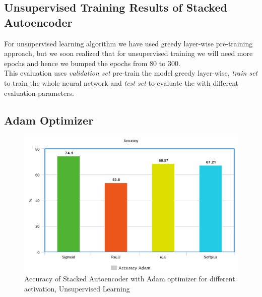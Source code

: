 \documentclass[12pt, a4paper]{report}
\begin{document}
\begin{appendices}
	
	
	
	





	
  \chapter{Unsupervised Training Results of Stacked Autoencoder}\label{app:unsuper_tf}
  For unsupervised learning algorithm we have used greedy layer-wise pre-training approach, but we soon realized that for unsupervised 			 training we will need more epochs and hence we bumped the epochs from 80 to 300.\\
  
This evaluation uses \textit{validation set} pre-train the model greedy layer-wise, \textit{train set} to train the whole neural network and \textit{test set} to evaluate the with different evaluation parameters.\\ \par

  \section{Adam Optimizer}
  	\begin{figure}[ht]
	\centering
	\captionsetup{justification=centering,margin=2cm}
	\includegraphics[width=12cm]{Adam_accuracy_tensorflow.png}
	\caption{ Accuracy of Stacked Autoencoder with Adam optimizer for different activation, Unsupervised Learning }
	\label{fig:acc_adam_tf}
	\end{figure}
	

\end{appendices}
\end{document}
